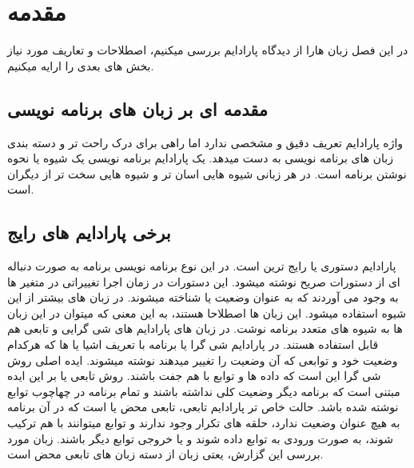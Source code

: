 \chapter{
مقدمه
}
\label{chp:chap1}\thispagestyle{empty}
در این فصل زبان هارا از دیدگاه پارادایم بررسی میکنیم، اصطلاحات و تعاریف مورد نیاز بخش های بعدی را ارایه میکنیم.
\section{
مقدمه ای بر زبان های برنامه نویسی
}
واژه پارادایم تعریف دقیق و مشخصی ندارد اما راهی برای درک راحت تر و دسته بندی زبان های برنامه نویسی به دست میدهد. یک پارادایم برنامه نویسی یک شیوه یا نحوه نوشتن برنامه است. در هر زبانی شیوه هایی اسان تر و شیوه هایی سخت تر از دیگران است. 

\section{
برخی پارادایم های رایج
}
پارادایم دستوری یا
رایج ترین است. در این نوع برنامه نویسی برنامه به صورت دنباله ای از دستورات صریح نوشته میشود. این دستورات در زمان اجرا تغییراتی در متغیر ها به وجود می آوردند که به عنوان وضعیت یا 
شناخته میشوند. در زبان های 
بیشتر از این شیوه استفاده میشود. این زبان ها اصطلاحا 
هستند، به این معنی که میتوان در این زبان ها به شیوه های متعدد برنامه نوشت. در زبان های 
 پارادایم های شی گرایی و تابعی هم قابل استفاده هستند. در پارادایم شی گرا یا
برنامه با تعریف اشیا یا 
ها که هرکدام وضعیت خود و توابعی که آن وضعیت را تغییر میدهند نوشته میشوند. ایده اصلی روش شی گرا این است که داده ها و توابع با هم جفت باشند. روش تابعی یا
بر این ایده مبتنی است که برنامه دیگر وضعیت کلی نداشته باشند و تمام برنامه در چهاچوب توابع نوشته شده باشد. حالت خاص تر پارادایم تابعی، تابعی محض یا
است که در آن برنامه به هیچ عنوان وضعیت ندارد، حلقه های تکرار وجود ندارند و توابع میتوانند با هم ترکیب شوند، به صورت ورودی به توابع داده شوند و یا خروجی توابع دیگر باشند. زبان مورد بررسی این گزارش، یعتی زبان
از دسته زبان های تابعی محض است.

